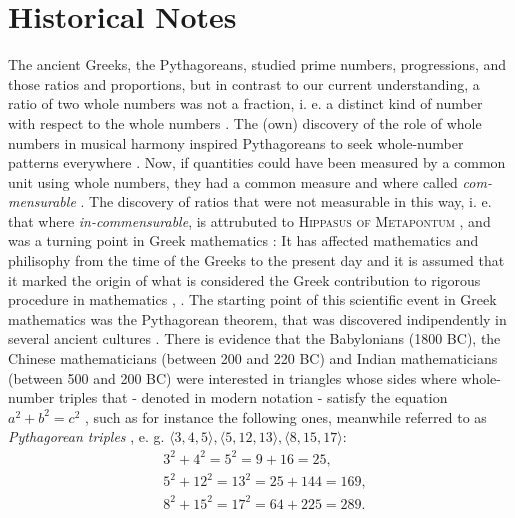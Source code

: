 \documentclass[11pt]{amsart}
\theoremstyle{definition}
\begin{document}
\section{Historical Notes}
The ancient Greeks, the Pythagoreans, studied prime numbers, progressions, and those ratios and proportions, but in contrast to our current understanding, a ratio of two whole numbers was not a fraction, i. e. a distinct kind of number with respect to the whole numbers \cite[32]{klineMathematicalThoughtAncient1990}.
The (own) discovery of the role of whole numbers in musical harmony inspired Pythagoreans to seek whole-number patterns everywhere \cite[11]{stillwellMathematicsItsHistory2010}.
Now, if quantities could have been measured by a common unit using whole numbers, they had a common measure and where called \emph{com-mensurable} \cite[32]{klineMathematicalThoughtAncient1990}.
The discovery of ratios that were not measurable in this way, i. e. that where \emph{in-commensurable}, is attrubuted to \textsc{Hippasus of Metapontum} \cite[32]{klineMathematicalThoughtAncient1990}, and was a turning point in Greek mathematics \cite[1]{stillwellStoryProofLogic2022}: It has affected mathematics and philisophy from the time of the Greeks to the present day \cite[59-60]{courantWhatMathematicsElementary1996} and it is assumed that it marked the origin of what is considered the Greek contribution to rigorous procedure in mathematics \cite[59]{courantWhatMathematicsElementary1996}, \cite[1]{stillwellStoryProofLogic2022}.
The starting point of this scientific event \cite[59]{courantWhatMathematicsElementary1996} in Greek mathematics was the Pythagorean theorem, that was discovered indipendently in several ancient cultures \cite[3]{stillwellStoryProofLogic2022}.
There is evidence \cite[4]{stillwellMathematicsItsHistory2010} that the Babylonians (1800 BC), the Chinese mathematicians (between 200 and 220 BC) and Indian mathematicians (between 500 and 200 BC) were interested in triangles whose sides where whole-number triples that - denoted in modern notation - satisfy the equation \(a^{2} + b^{2} = c^{2}\) \cite[3-4]{stillwellStoryProofLogic2022}, such as for instance the following ones, meanwhile referred to as \emph{Pythagorean triples} \cite[4]{stillwellMathematicsItsHistory2010}, e. g. \(\langle 3, 4, 5 \rangle, \langle 5, 12, 13 \rangle, \langle 8, 15, 17 \rangle\):
\begin{align*}
     & 3^{2} + 4^{2}  =  5^{2}  = 9 + 16 = 25,     \\
     & 5^{2} + 12^{2} =  13^{2}  = 25 + 144 = 169, \\
     & 8^{2} + 15^{2} = 17^{2} = 64 + 225 = 289.
\end{align*}
\end{document}
